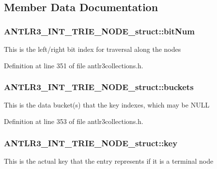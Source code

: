 \subsection{Member Data Documentation}
\hypertarget{struct_a_n_t_l_r3___i_n_t___t_r_i_e___n_o_d_e__struct_ac512fa1b8d8c3508dbdf60904c7d7bbd}{
\subsubsection[{bit\-Num}]{ A\-N\-T\-L\-R3\-\_\-\-I\-N\-T\-\_\-\-T\-R\-I\-E\-\_\-\-N\-O\-D\-E\-\_\-struct\-::bit\-Num}}\label{struct_a_n_t_l_r3___i_n_t___t_r_i_e___n_o_d_e__struct_ac512fa1b8d8c3508dbdf60904c7d7bbd}
This is the left/right bit index for traversal along the nodes 

Definition at line 351 of file antlr3collections.\-h.

\hypertarget{struct_a_n_t_l_r3___i_n_t___t_r_i_e___n_o_d_e__struct_a50dfd26bdc90f07b85db6a58069842f6}{
\subsubsection[{buckets}]{ A\-N\-T\-L\-R3\-\_\-\-I\-N\-T\-\_\-\-T\-R\-I\-E\-\_\-\-N\-O\-D\-E\-\_\-struct\-::buckets}}\label{struct_a_n_t_l_r3___i_n_t___t_r_i_e___n_o_d_e__struct_a50dfd26bdc90f07b85db6a58069842f6}
This is the data bucket(s) that the key indexes, which may be N\-U\-L\-L 

Definition at line 353 of file antlr3collections.\-h.

\hypertarget{struct_a_n_t_l_r3___i_n_t___t_r_i_e___n_o_d_e__struct_ae2e3dd0ed90f313ba1fb40013272c735}{
\subsubsection[{key}]{ A\-N\-T\-L\-R3\-\_\-\-I\-N\-T\-\_\-\-T\-R\-I\-E\-\_\-\-N\-O\-D\-E\-\_\-struct\-::key}}\label{struct_a_n_t_l_r3___i_n_t___t_r_i_e___n_o_d_e__struct_ae2e3dd0ed90f313ba1fb40013272c735}
This is the actual key that the entry represents if it is a terminal node 

